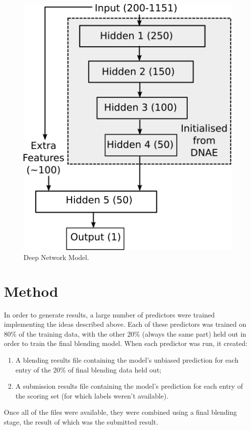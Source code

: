 \documentclass{article}
\begin{document}
\begin{figure}[t]
\vskip 0.2in
\begin{center}
\centerline{\includegraphics{deepnet}}
\caption{Deep Network Model.}
\label{figure:deepnet}
\end{center}
\vskip -0.2in
\end{figure} 

\section{Method}

In order to generate results, a large number of predictors were trained implementing the ideas described above.  Each of these predictors was trained on 80\% of the training data, with the other 20\% (always the same part) held out in order to train the final blending model.  When each predictor was run, it created:
%
\begin{enumerate}
\item A blending results file containing the model's unbiased prediction for each entry of the 20\% of final blending data held out;
\item A submission results file containing the model's prediction for each entry of the scoring set (for which labels weren't available).
\end{enumerate}
%
Once all of the files were available, they were combined using a final blending stage, the result of which was the submitted result.
\end{document}
